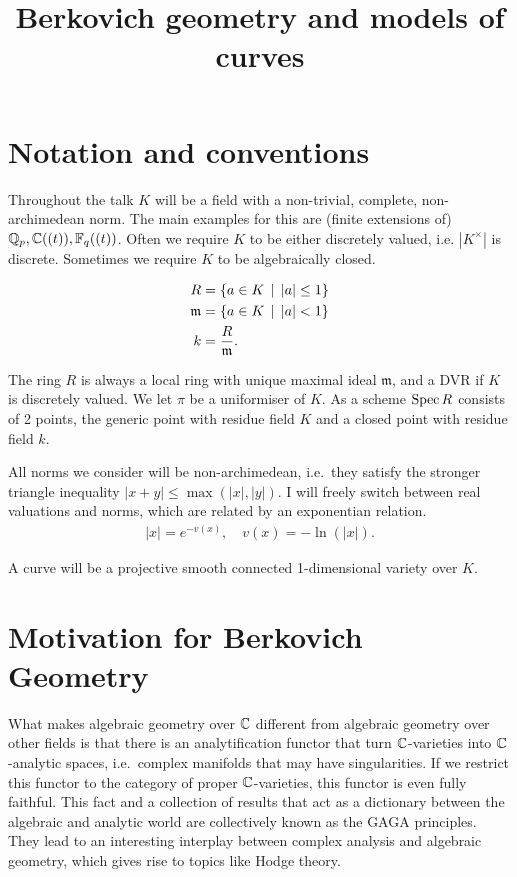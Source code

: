 \documentclass[a4paper]{article}
\title{Berkovich geometry and models of curves}
\begin{document}
\maketitle	

\setcounter{section}{-1}
\section{Notation and conventions} \label{sec:notation_and_conventions}
Throughout the talk $K$ will be a field with a non-trivial, complete, non-archimedean norm. 
The main examples for this are (finite extensions of) $\mathbb{Q}_p, \mathbb{C}((t)), \mathbb{F}_q((t))$. 
Often we require $K$ to be either discretely valued, i.e. $|K^{\times }|$ is discrete. 
Sometimes we require $K$ to be algebraically closed. 

\begin{notation}
	\begin{align*}
		R &= \{a \in K \st |a| \le 1\}  \\
		\mathfrak{m}  &=  \{a \in K \st |a| < 1\} \\
		k &= \frac{R}{\mathfrak{m} }
	.\end{align*}
\end{notation}
The ring $R$ is always a local ring with unique maximal ideal $\mathfrak{m} $, and a DVR if  $K$ is discretely valued. We let $\pi$ be a uniformiser of $K$.  
As a scheme $\operatorname{Spec} R$ consists of 2 points, the generic point with residue field $K$ and a closed point with residue field $k$. 

All norms we consider will be non-archimedean, i.e.\ they satisfy the stronger triangle inequality $|x + y| \le \max(|x|, |y|)$. 
I will freely switch between real valuations and norms, which are related by an exponentian relation.
\begin{align*}
	|x| = e^{-v(x)}, \quad v(x) = -\ln(|x|)
.\end{align*}

A curve will be a projective smooth connected 1-dimensional  variety over $K$. 

\section{Motivation for Berkovich Geometry} \label{sec:motivation_for_berkovich_geometry}

What makes algebraic geometry over $\mathbb{C}$ different from algebraic geometry over other fields is that there is an analytification functor that turn $\mathbb{C}$-varieties into $\mathbb{C}$-analytic spaces, i.e.\ complex manifolds that may have singularities. 
If we restrict this functor to the category of proper  $\mathbb{C}$-varieties, this functor is even fully faithful. This fact and a collection of results that act as a dictionary between the algebraic and analytic world are collectively known as the GAGA principles. 
They lead to an interesting interplay between complex analysis and algebraic geometry, which gives rise to topics like Hodge theory. 
\end{document}

